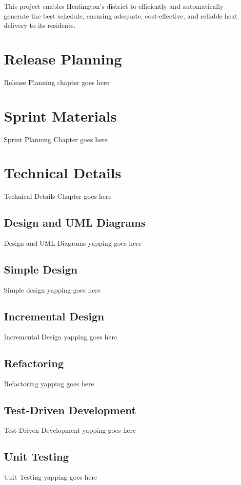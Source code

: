 \documentclass[12pt]{report}
\begin{document}
This project enables Heatington’s district to efficiently and automatically generate the best schedule, ensuring adequate, cost-effective, and reliable heat delivery to its residents.

\chapter{Release Planning}
Release Planning chapter goes here

\chapter{Sprint Materials}
Sprint Planning Chapter goes here

\chapter{Technical Details}
Technical Details Chapter goes here

\section{Design and UML Diagrams}
Design and UML Diagrams yapping goes here

\section{Simple Design}
Simple design yapping goes here

\section{Incremental Design}
Incremental Design yapping goes here

\section{Refactoring}
Refactoring yapping goes here

\section{Test-Driven Development}
Test-Driven Development yapping goes here

\section{Unit Testing}
Unit Testing yapping goes here
\end{document}
